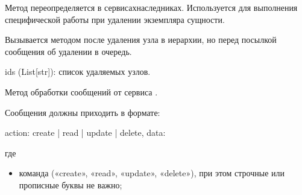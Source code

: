 \documentclass[a4paper,10pt,russian]{sphinxmanual}
\begin{document}
\begin{fulllineitems}
\begin{fulllineitems}
\begin{description}
\end{description}

\end{fulllineitems}



\begin{fulllineitems}

\pysigstartsignatures
{}
\pysigstopsignatures
\sphinxAtStartPar
Метод переопределяется в сервисах\sphinxhyphen{}наследниках.
Используется для выполнения специфической работы при удалении
экземпляра сущности.

\sphinxAtStartPar
Вызывается методом  после удаления узла в иерархии, но
перед посылкой сообщения об удалении в очередь.
\begin{description}
\sphinxAtStartPar
ids (List{[}str{]}): список  удаляемых узлов.

\end{description}

\end{fulllineitems}



\begin{fulllineitems}

\pysigstartsignatures
{}
\pysigstopsignatures
\sphinxAtStartPar
Метод обработки сообщений от сервиса .

\sphinxAtStartPar
Сообщения должны приходить в формате:

\begin{sphinxVerbatim}[commandchars=\\\{\}]
\PYGZob{}
    \PYGZdq{}action\PYGZdq{}: \PYGZdq{}create | read | update | delete\PYGZdq{},
    \PYGZdq{}data: \PYGZob{}\PYGZcb{}
\PYGZcb{}
\end{sphinxVerbatim}

\sphinxAtStartPar
где
\begin{itemize}
\item {}
\sphinxAtStartPar
{} \sphinxhyphen{} команда («create», «read», «update», «delete»), при
этом строчные или прописные буквы \sphinxhyphen{} не важно;


\end{itemize}
\end{fulllineitems}
\end{fulllineitems}
\end{document}
